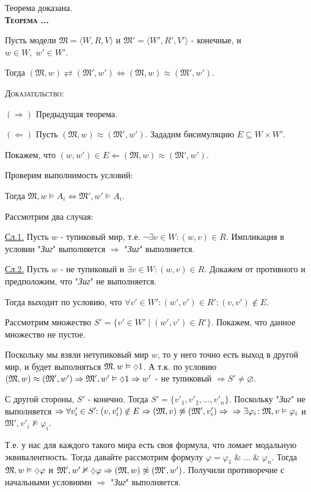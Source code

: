 \documentclass[18pt, a4paper]{extarticle}
\newcounter{par}
\newcounter{spar}
\newcounter{zap}
\newcommand{\teor}{\textbf{\textsc{Теорема \thepar.\if\thespar1\thespar.\fi\thezap.\;}}\stepcounter{zap}}
\newcommand{\mM}{\mathfrak{M}}
\newcommand{\dok}{\textsc{Доказательство:}}
\newcommand{\rightdok}{\boxed{(\Rightarrow)}}
\newcommand{\leftdok}{\boxed{(\Leftarrow)}}
\newcommand{\ampersand}{\;\&\;}
\newcommand{\vp}{\varphi}
\newcommand{\vD}{\vDash}
\newcommand{\lot}[3]{#1_#2,\dots,#1_#3}
\newcommand{\may}{\scalebox{0.8}{$\diamondsuit$}}
\begin{document}
Теорема доказана.\\

\teor

Пусть модели $\mM=\langle W,R,V\rangle$ и $\mM'=\langle W',R',V'\rangle$ - конечные, и \\$w\in W,\;w'\in W'$.

Тогда $(\mM,w)\rightleftarrows(\mM',w')\Leftrightarrow(\mM,w)\approx(\mM',w')$.

\dok

$\rightdok$ Предыдущая теорема.

$\leftdok$ Пусть $(\mM,w)\approx(\mM',w')$. Зададим бисимуляцию $E\subseteq W\times W'$.

Покажем, что $(w,w')\in E\Leftarrow(\mM,w)\approx(\mM',w')$.

Проверим выполнимость условий:


Тогда $\mM,w\vD A_i\Leftrightarrow\mM',w'\vD A_i$.


Рассмотрим два случая:

\underline{Сл.1.} Пусть $w$ - тупиковый мир, т.е. $\lnot\exists v\in W\!\!:(w,v)\in R$. Импликация в условии "\textit{Зиг}"{} выполняется $\Rightarrow$ "\textit{Зиг}"{} выполняется.

\underline{Сл.2.} Пусть $w$ - не тупиковый и $\exists v\in W\!\!:(w,v)\in R$. Докажем от противного и предположим, что "\textit{Зиг}"{} не выполняется.

Тогда выходит по условию, что $\forall v'\in W'\!\!:(w',v')\in R'\!\!:(v,v')\notin E$.

Рассмотрим множество $S'=\{v'\in W'\;|\;(w',v')\in R'\}$. Покажем, что данное множество не пустое.

Поскольку мы взяли нетупиковый мир $w$, то у него точно есть выход в другой мир, и будет выполняться $\mM,w\vD\may1$. А т.к. по условию\\ $(\mM,w)\approx(\mM',w')\Rightarrow\mM',w'\vD\may1\Rightarrow w'$ - не тупиковый $\Rightarrow S'\neq\varnothing$. 

С другой стороны, $S'$ - конечно. Тогда $S'=\{v'_1,\lot {v'} 2 n\}$. Поскольку "\textit{Зиг}"{} не выполняется $\Rightarrow\forall v'_i\in S'\!\!:(v,v'_i)\notin E\Rightarrow(\mM,v)\not\approx(\mM',v'_i)\Rightarrow\newline\Rightarrow\exists\vp_i\!:\mM,v\vD\vp_i$ и $\mM',v'_i\nvDash\vp_i$.

Т.е. у нас для каждого такого мира есть своя формула, что ломает модальную эквивалентность. Тогда давайте рассмотрим формулу $\vp=\vp_1\ampersand\dots\ampersand\vp_n$. Тогда $\mM,w\vD\may\vp$ и $\mM',w'\nvDash\may\vp\Rightarrow(\mM,w)\not\approx(\mM',w')$. Получили противоречие с начальными условиями $\Rightarrow$ "\textit{Зиг}"{} выполняется.
\end{document}
